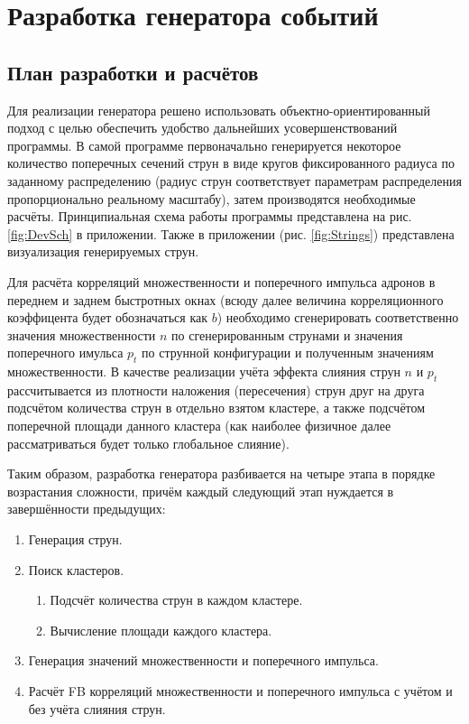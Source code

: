 \section{Разработка генератора событий}
\subsection{План разработки и расчётов}
Для реализации генератора решено использовать объектно-ориентированный подход с целью обеспечить удобство дальнейших усовершенствований программы. В самой программе первоначально генерируется некоторое количество поперечных сечений струн в виде кругов фиксированного радиуса по заданному распределению (радиус струн соответствует параметрам распределения пропорционально реальному масштабу), затем производятся необходимые расчёты. Принципиальная схема работы программы представлена на рис. \ref{fig:DevSch} в приложении. Также в приложении (рис. \ref{fig:Strings}) представлена визуализация генерируемых струн. 

Для расчёта корреляций множественности и поперечного импульса адронов в переднем и заднем быстротных окнах (всюду далее величина корреляционного коэффицента будет обозначаться как $b$) необходимо сгенерировать соответственно значения множественности $n$ по сгенерированным струнами и значения поперечного имульса $p_t$ по струнной конфигурации и полученным значениям множественности. В качестве реализации учёта эффекта слияния струн $n$ и $p_t$ рассчитывается из плотности наложения (пересечения) струн друг на друга подсчётом количества струн в отдельно взятом кластере, а также подсчётом поперечной площади данного кластера (как наиболее физичное далее рассматриваться будет только глобальное слияние). 

Таким образом, разработка генератора разбивается на четыре этапа в порядке возрастания сложности, причём каждый следующий этап нуждается в завершённости предыдущих:
\begin{enumerate}[label=\arabic*.]
\item	Генерация струн.
\item	Поиск кластеров.
	\begin{enumerate}
	\item	Подсчёт количества струн в каждом кластере.
	\item	Вычисление площади каждого кластера.
	\end{enumerate}
\item	Генерация значений множественности и поперечного импульса.
\item	Расчёт FB корреляций множественности и поперечного импульса с учётом и без учёта слияния струн.
\end{enumerate}
